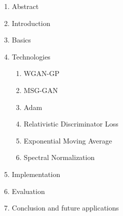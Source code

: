 \documentclass[conference,onecolumn,compsoc]{IEEEtran}
\begin{document}
\noindent
\begin{enumerate}
  \item Abstract
  \item Introduction
  \item Basics \cite{goodfellow2014generative}
  \item Technologies
  \begin{enumerate}
    \item WGAN-GP \cite{arjovsky2017wasserstein,gulrajani2017improved}
    \item MSG-GAN \cite{karnewar2020msggan}
    \item Adam \cite{kingma2017adam}
    \item Relativistic Discriminator Loss \cite{jolicoeurmartineau2018relativistic}
    \item Exponential Moving Average \cite{yazıcı2019unusual}
    \item Spectral Normalization \cite{miyato2018spectral}
  \end{enumerate}
  \item Implementation
  \item Evaluation
  \item Conclusion and future applications
\end{enumerate}

\printbibliography
\end{document}
